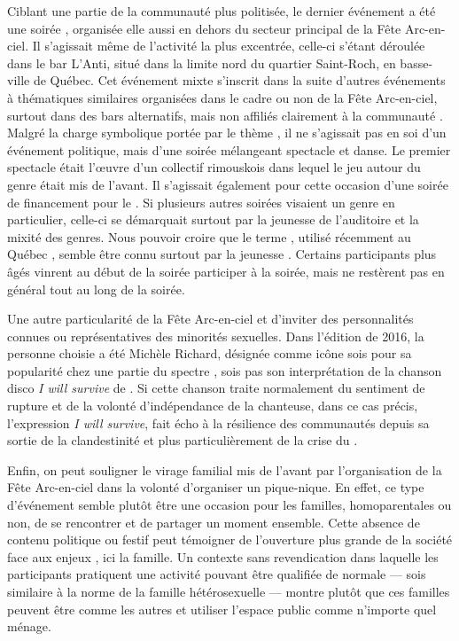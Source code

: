 Ciblant une partie de la communauté plus politisée, le dernier événement a été une soirée \qu, organisée elle aussi en dehors du secteur principal de la Fête Arc-en-ciel.
Il s'agissait même de l'activité la plus excentrée, celle-ci s'étant déroulée dans le bar L'Anti, situé dans la limite nord du quartier Saint-Roch, en basse-ville de Québec.
Cet événement mixte s'inscrit dans la suite d'autres événements à thématiques similaires organisées dans le cadre ou non de la Fête Arc-en-ciel, surtout dans des bars alternatifs, mais non affiliés clairement à la communauté \lgbt.
Malgré la charge symbolique portée par le thème \qu, il ne s'agissait pas en soi d'un événement politique, mais d'une soirée mélangeant spectacle et danse.
Le premier spectacle était l'œuvre d'un collectif \qu rimouskois dans lequel le jeu autour du genre était mis de l'avant.
Il s'agissait également pour cette occasion d'une soirée de financement pour le \ggul.
Si plusieurs autres soirées visaient un genre en particulier, celle-ci se démarquait surtout par la jeunesse de l'auditoire et la mixité des genres.
Nous pouvoir croire que le terme \qu, utilisé récemment au Québec , semble être connu surtout par la jeunesse \lgbt.
Certains participants plus âgés vinrent au début de la soirée participer à la soirée, mais ne restèrent pas en général tout au long de la soirée.

Une autre particularité de la Fête Arc-en-ciel et d'inviter des personnalités connues ou représentatives des minorités sexuelles.
Dans l'édition de 2016, la personne choisie a été Michèle Richard, désignée comme icône sois pour sa popularité chez une partie du spectre \lgbt{}, sois pas son interprétation de la chanson disco \emph{I will survive} de .
Si cette chanson traite normalement du sentiment de rupture et de la volonté d'indépendance de la chanteuse, dans ce cas précis, l'expression \emph{I will survive}, fait écho à la résilience des communautés \lgbt depuis sa sortie de la clandestinité et plus particulièrement de la crise du \vih{}.

Enfin, on peut souligner le virage familial mis de l'avant par l'organisation de la Fête Arc-en-ciel dans la volonté d'organiser un pique-nique.
En effet, ce type d'événement semble plutôt être une occasion pour les familles, homoparentales ou non, de se rencontrer et de partager un moment ensemble.
Cette absence de contenu politique ou festif peut témoigner de l'ouverture plus grande de la société face aux enjeux \lgbt, ici la famille.
Un contexte sans revendication dans laquelle les participants pratiquent une activité pouvant être qualifiée de normale --- sois similaire à la norme de la famille hétérosexuelle --- montre plutôt que ces familles peuvent être comme les autres et utiliser l'espace public comme n'importe quel ménage.

